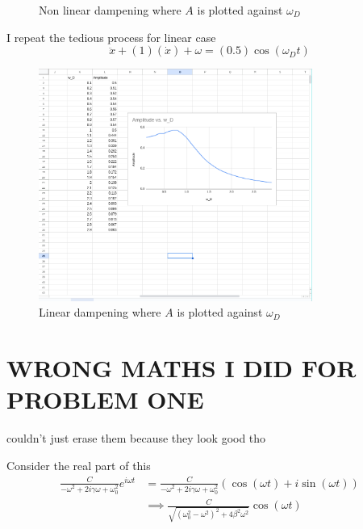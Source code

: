 \documentclass[12pt,letter]{article}
\begin{document}
{\begin{figure}[H]
	\caption{Non linear dampening where $A$ is plotted against $\omega_D$}
	\label{fig:ss-sshw4-tg2-png}
\end{figure}
\newpage
I repeat the tedious process for linear case 
\[
\ddot{x} +(1) (\dot{x})  + \omega  = (0.5) \cos(\omega_D t)
\]
\begin{figure}[H]
	\centering
	\includegraphics[width=0.8\textwidth]{ss/sshw4/tg3.png}
	\caption{Linear dampening where $A$ is plotted against $\omega_D$}
	\label{fig:ss-sshw4-tg2-png}
\end{figure}



\newpage\section*{WRONG MATHS I DID FOR PROBLEM ONE}
couldn't just erase them because they look good tho 

Consider the real part of this
\begin{align*}
	\frac{C}{- \omega^2 + 2 i \gamma \omega + \omega_0^2 } e^{i \omega t} &=  
	\frac{C}{- \omega^2 + 2 i \gamma \omega + \omega_0^2 } \left(\cos \left(\omega t\right) + i \sin \left(\omega t\right)\right) 
	\\ & \implies \frac{C}{\sqrt{(\omega_0^2 - \omega^2 )^2 + 4\beta^2 \omega^2} } \cos \left(\omega t\right) 
\end{align*}
}
\end{document}
